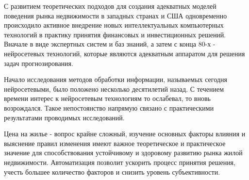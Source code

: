 С развитием теоретических подходов для создания адекватных моделей поведения рынка недвижимости в западных странах и
США одновременно происходило активное внедрение новых интеллектуальных компьютерных технологий в практику принятия
финансовых и инвестиционных решений. Вначале в виде экспертных систем и баз знаний, а затем с конца 80-х - нейросетевых
технологий, которые являются адекватным аппаратом для решения задач прогнозирования.

Начало исследования методов обработки информации, называемых сегодня нейросетевыми, было положено несколько десятилетий
назад. С течением времени интерес к нейросетевым технологиям то ослабевал, то вновь возрождался. Такое непостоянство
напрямую связано с практическими результатами проводимых исследований.

Цена на жилье - вопрос крайне сложный, изучение основных факторы влияния и выяснение правил изменения имеют важное теоретическое и
практическое значение для способствования устойчивому и здоровому развитию рынка жилой недвижимости.
Автоматизация позволит ускорить процесс принятия решения, учесть
большее количество факторов и снизить уровень субъективности.


